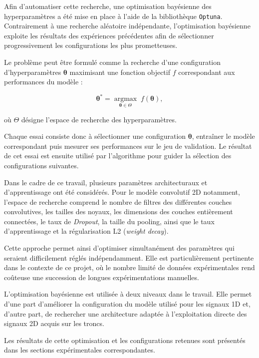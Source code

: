 \documentclass[12pt,a4paper,twoside]{article}
\begin{document}
Afin d'automatiser cette recherche, une optimisation bayésienne des hyperparamètres a été mise en place à l'aide de la bibliothèque \texttt{Optuna}. Contrairement à une recherche aléatoire indépendante, l'optimisation bayésienne exploite les résultats des expériences précédentes afin de sélectionner progressivement les configurations les plus prometteuses.

Le problème peut être formulé comme la recherche d'une configuration d'hyperparamètres $\boldsymbol{\theta}$ maximisant une fonction objectif $f$ correspondant aux performances du modèle :

\begin{equation}
\boldsymbol{\theta}^*
=
\underset{\boldsymbol{\theta} \in \Theta}{\operatorname{argmax}}
\; f(\boldsymbol{\theta}),
\end{equation}

où $\Theta$ désigne l'espace de recherche des hyperparamètres.

Chaque essai consiste donc à sélectionner une configuration $\boldsymbol{\theta}$, entraîner le modèle correspondant puis mesurer ses performances sur le jeu de validation. Le résultat de cet essai est ensuite utilisé par l'algorithme pour guider la sélection des configurations suivantes.

Dans le cadre de ce travail, plusieurs paramètres architecturaux et d'apprentissage ont été considérés. Pour le modèle convolutif 2D notamment, l'espace de recherche comprend le nombre de filtres des différentes couches convolutives, les tailles des noyaux, les dimensions des couches entièrement connectées, le taux de \textit{Dropout}, la taille du pooling, ainsi que le taux d'apprentissage et la régularisation L2 (\textit{weight decay}).

Cette approche permet ainsi d'optimiser simultanément des paramètres qui seraient difficilement réglés indépendamment. Elle est particulièrement pertinente dans le contexte de ce projet, où le nombre limité de données expérimentales rend coûteuse une succession de longues expérimentations manuelles.

L'optimisation bayésienne est utilisée à deux niveaux dans le travail. Elle permet d'une part d'améliorer la configuration du modèle utilisé pour les signaux 1D et, d'autre part, de rechercher une architecture adaptée à l'exploitation directe des signaux 2D acquis sur les troncs.

Les résultats de cette optimisation et les configurations retenues sont présentés dans les sections expérimentales correspondantes.
\end{document}
